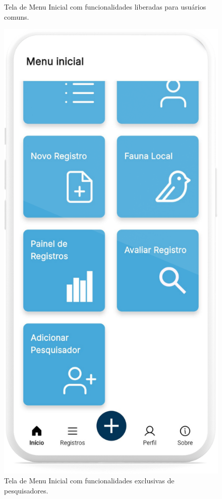 \begin{figure}[H]
\begin{minipage}[t]{0.48\textwidth}
        \caption{Tela de Menu Inicial com funcionalidades liberadas para usuários comuns.}
        \label{fig:menu-inicial-user}
    \end{minipage}
    \hfill
    \begin{minipage}[t]{0.48\textwidth}
        \centering
        \includegraphics[height=0.72\textheight]{imagens/sistema/device_frame/menuPesquisador.png}
        \caption{Tela de Menu Inicial com funcionalidades exclusivas de pesquisadores.}
        \label{fig:menu-inicial-admin}
    \end{minipage}
\end{figure}

